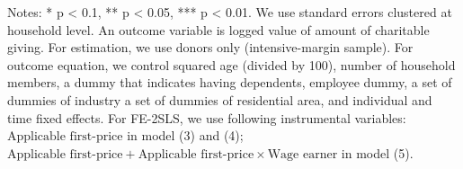 \begin{table}
\begin{threeparttable}
\begin{tablenotes}
\item Notes: * p < 0.1, ** p < 0.05, *** p < 0.01. We use standard errors clustered at household level. An outcome variable is logged value of amount of charitable giving. For estimation, we use donors only (intensive-margin sample). For outcome equation, we control squared age (divided by 100), number of household members, a dummy that indicates having dependents, employee dummy, a set of dummies of industry a set of dummies of residential area, and individual and time fixed effects. For FE-2SLS, we use following instrumental variables: $\text{Applicable first-price}$ in model (3) and (4); $\text{Applicable first-price} + \text{Applicable first-price} \times \text{Wage earner}$ in model (5).
\end{tablenotes}
\end{threeparttable}
\end{table}
